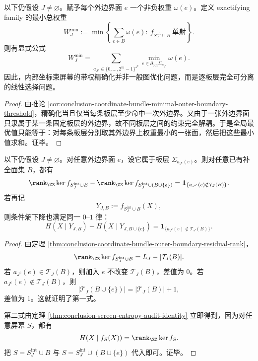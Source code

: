 \begin{theorem}[带权外边界精确化的分层最优化公式]\label{thm:conclusion-coordinate-bundle-weighted-boundary-exactification}
以下仍假设 \(J\neq\varnothing\)。赋予每个外边界面 \(e\) 一个非负权重 \(\omega(e)\)。定义 exactifying family 的最小总权重
\[
W_J^{\min}:=
\min\left\{
\sum_{e\in B}\omega(e):
\ f_{S_J^{\mathrm{int}}\cup B}\ \text{单射}
\right\}.
\]
则有显式公式
\[
W_J^{\min}
=
\sum_{a_{J^c}\in\{0,\dots,2^m-1\}^{J^c}}
\min_{e\in \partial_{\mathrm{out}}\Sigma_{a_{J^c}}}\omega(e).
\]
因此，内部坐标束屏幕的带权精确化并非一般图优化问题，而是逐板层完全可分离的线性选择问题。
\end{theorem}
\begin{proof}
由推论 \ref{cor:conclusion-coordinate-bundle-minimal-outer-boundary-threshold}，精确化当且仅当每条板层至少命中一次外边界。又由于一张外边界面只隶属于某一条固定板层的外边界，故不同板层之间的约束完全解耦。于是全局最优值只能等于：对每条板层分别取其外边界上权重最小的一张面，然后把这些最小值求和。证毕。
\end{proof}

\begin{corollary}\label{cor:conclusion-coordinate-bundle-single-face-strict-zero-one-law}
以下仍假设 \(J\neq\varnothing\)。对任意外边界面 \(e\)，设它属于板层 \(\Sigma_{a_{J^c}(e)}\)。则对任意已有补全面集 \(B\)，都有
\[
\rank_{\ZZ}\ker f_{S_J^{\mathrm{int}}\cup B}
-
\rank_{\ZZ}\ker f_{S_J^{\mathrm{int}}\cup(B\cup\{e\})}
=
\mathbf 1_{\{a_{J^c}(e)\notin \mathcal T_J(B)\}}.
\]
若再记
\[
Y_{J,B}:=f_{S_J^{\mathrm{int}}\cup B}(X),
\]
则条件熵下降也满足同一 \(0\text{--}1\) 律：
\[
H(X\mid Y_{J,B})-H(X\mid Y_{J,B\cup\{e\}})
=
\mathbf 1_{\{a_{J^c}(e)\notin \mathcal T_J(B)\}}.
\]
\end{corollary}
\begin{proof}
由定理 \ref{thm:conclusion-coordinate-bundle-outer-boundary-residual-rank}，
\[
\rank_{\ZZ}\ker f_{S_J^{\mathrm{int}}\cup B}=L_J-|\mathcal T_J(B)|.
\]
若 \(a_{J^c}(e)\in\mathcal T_J(B)\)，则加入 \(e\) 不改变 \(\mathcal T_J(B)\)，差值为 \(0\)。若 \(a_{J^c}(e)\notin\mathcal T_J(B)\)，则
\[
|\mathcal T_J(B\cup\{e\})|=|\mathcal T_J(B)|+1,
\]
差值为 \(1\)。这就证明了第一式。

第二式由定理 \ref{thm:conclusion-screen-entropy-audit-identity} 立即得到，因为对任意屏幕 \(S\)，都有
\[
H(X\mid f_S(X))=\rank_{\ZZ}\ker f_S.
\]
把 \(S=S_J^{\mathrm{int}}\cup B\) 与 \(S=S_J^{\mathrm{int}}\cup(B\cup\{e\})\) 代入即可。证毕。
\end{proof}

